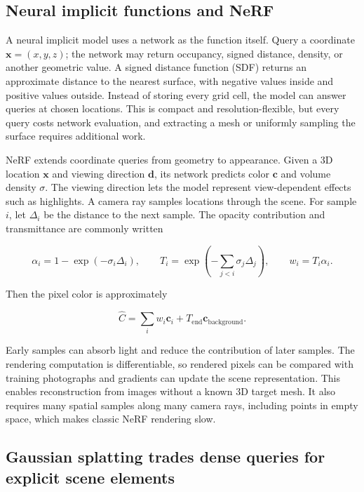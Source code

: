 \subsection{Neural implicit functions and NeRF}\label{04-visual-computing-ii-ch034-neural-implicit-functions-and-nerf}

\hypertarget{04-visual-computing-ii-ch034-neural-implicit-functions-and-nerf}{}

A neural implicit model uses a network as the function itself. Query a coordinate \(\mathbf{x}=(x,y,z)\); the network may return occupancy, signed distance, density, or another geometric value. A signed distance function (SDF) returns an approximate distance to the nearest surface, with negative values inside and positive values outside. Instead of storing every grid cell, the model can answer queries at chosen locations. This is compact and resolution-flexible, but every query costs network evaluation, and extracting a mesh or uniformly sampling the surface requires additional work.

NeRF extends coordinate queries from geometry to appearance. Given a 3D location \(\mathbf{x}\) and viewing direction \(\mathbf{d}\), its network predicts color \(\mathbf{c}\) and volume density \(\sigma\). The viewing direction lets the model represent view-dependent effects such as highlights. A camera ray samples locations through the scene. For sample \(i\), let \(\Delta_i\) be the distance to the next sample. The opacity contribution and transmittance are commonly written

\[
\alpha_i=1-\exp(-\sigma_i\Delta_i),\qquad
T_i=\exp\left(-\sum_{j<i}\sigma_j\Delta_j\right),\qquad
w_i=T_i\alpha_i.
\]

Then the pixel color is approximately

\[
\hat{C}=\sum_i w_i\mathbf{c}_i+T_{\text{end}}\mathbf{c}_{\text{background}}.
\]

Early samples can absorb light and reduce the contribution of later samples. The rendering computation is differentiable, so rendered pixels can be compared with training photographs and gradients can update the scene representation. This enables reconstruction from images without a known 3D target mesh. It also requires many spatial samples along many camera rays, including points in empty space, which makes classic NeRF rendering slow.

\subsection{Gaussian splatting trades dense queries for explicit scene elements}\label{04-visual-computing-ii-ch034-gaussian-splatting-trades-dense-queries-for-explicit-scene-elements}

